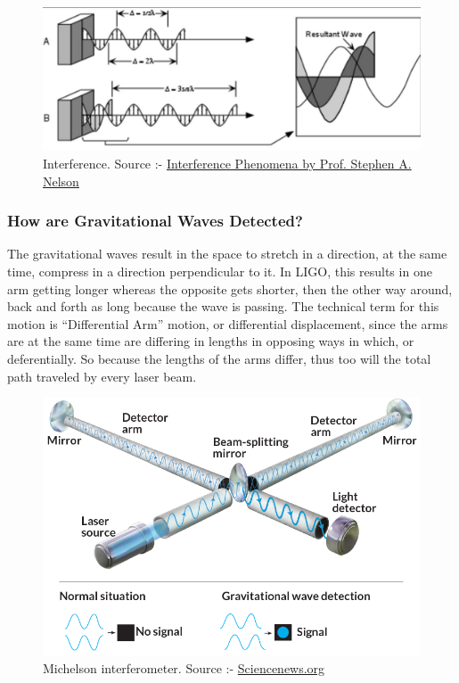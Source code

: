 \begin{figure}[htpb]
    \centering
    \includegraphics[scale=0.585]{gw-physics-and-ligo/images.tex/interference.jpg}
    \caption{Interference. Source :- \href{https://www.tulane.edu/~sanelson/eens211/interference_of_light.htm}{Interference Phenomena by Prof. Stephen A. Nelson}}
\end{figure}

\subsubsection{How are Gravitational Waves Detected?}

The gravitational waves result in the space to stretch in a direction, at the same time,  compress in a direction perpendicular to it. In LIGO, this results in one arm getting longer whereas the opposite gets shorter, then the other way around, back and forth as long because the wave is passing.  The technical term for this motion is “Differential Arm” motion, or differential displacement, since the arms are at the same time are differing in lengths in opposing ways in which, or deferentially. So because the lengths of the arms differ, thus too will the total path traveled by every laser beam.

\begin{figure}[h]
    \centering
    \includegraphics[scale=0.52]{gw-physics-and-ligo/images.tex/Interferometer.jpg}
    \caption{Michelson interferometer.\; Source :- \href{https://www.sciencenews.org/article/trio-wins-physics-nobel-prize-gravitational-wave-detection}{Sciencenews.org}}
\end{figure}

